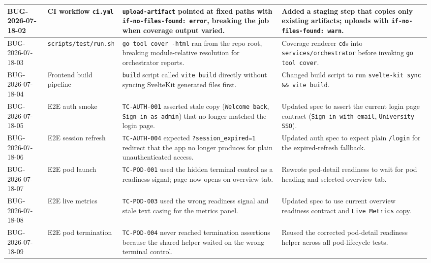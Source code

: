 \documentclass[12pt,a4paper]{article}
\begin{document}
\begin{center}
\begin{longtable}{|>{\RaggedRight\arraybackslash}p{1.9cm}|>{\RaggedRight\arraybackslash}p{2.0cm}|>{\RaggedRight\arraybackslash}p{3.9cm}|>{\RaggedRight\arraybackslash}p{3.8cm}|}
BUG-2026-07-18-02 &
  CI workflow \texttt{ci.yml} &
  \texttt{upload-artifact} pointed at fixed paths with \texttt{if-no-files-found: error}, breaking the job when coverage output varied. &
  Added a staging step that copies only existing artifacts; uploads with \texttt{if-no-files-found: warn}. \\
\hline

BUG-2026-07-18-03 &
  \texttt{scripts/test/run.sh} &
  \texttt{go tool cover -html} ran from the repo root, breaking module-relative resolution for orchestrator reports. &
  Coverage renderer \texttt{cd}s into \texttt{services/orchestrator} before invoking \texttt{go tool cover}. \\
\hline

BUG-2026-07-18-04 &
  Frontend build pipeline &
  \texttt{build} script called \texttt{vite build} directly without syncing SvelteKit generated files first. &
  Changed build script to run \texttt{svelte-kit sync \&\& vite build}. \\
\hline

BUG-2026-07-18-05 &
  E2E auth smoke &
  \texttt{TC-AUTH-001} asserted stale copy (\texttt{Welcome back}, \texttt{Sign in as admin}) that no longer matched the login page. &
  Updated spec to assert the current login page contract (\texttt{Sign in with email}, \texttt{University SSO}). \\
\hline

BUG-2026-07-18-06 &
  E2E session refresh &
  \texttt{TC-AUTH-004} expected \texttt{?session\_expired=1} redirect that the app no longer produces for plain unauthenticated access. &
  Updated auth spec to expect plain \texttt{/login} for the expired-refresh fallback. \\
\hline

BUG-2026-07-18-07 &
  E2E pod launch &
  \texttt{TC-POD-001} used the hidden terminal control as a readiness signal; page now opens on overview tab. &
  Rewrote pod-detail readiness to wait for pod heading and selected overview tab. \\
\hline

BUG-2026-07-18-08 &
  E2E live metrics &
  \texttt{TC-POD-003} used the wrong readiness signal and stale text casing for the metrics panel. &
  Updated spec to use current overview readiness contract and \texttt{Live Metrics} copy. \\
\hline

BUG-2026-07-18-09 &
  E2E pod termination &
  \texttt{TC-POD-004} never reached termination assertions because the shared helper waited on the wrong terminal control. &
  Reused the corrected pod-detail readiness helper across all pod-lifecycle tests. \\
\hline


\end{longtable}
\end{center}
\end{document}
